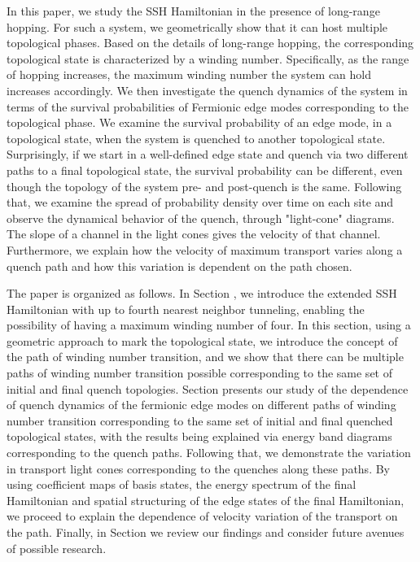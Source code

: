 \documentclass[aps,pra,reprint,superscriptaddress,longbibliography]{revtex4-2}
\newcommand{\RNum}[1]{\uppercase\expandafter{\romannumeral #1\relax}}
\begin{document}
In this paper, we study the SSH Hamiltonian in the presence of long-range hopping. For such a system, we geometrically show that it can host multiple topological phases. Based on the details of long-range hopping, the corresponding topological state is characterized by a winding number. Specifically, as the range of hopping increases, the maximum winding number the system can hold increases accordingly. We then investigate the quench dynamics of the system in terms of the survival probabilities of Fermionic edge modes corresponding to the topological phase. We examine the survival probability of an edge mode, in a topological state, when the system is quenched to another topological state. Surprisingly,  if we start in a well-defined edge state and quench via two different paths to a final topological state, the survival probability can be different, even though the topology of the system pre- and post-quench is the same. 
Following that, we examine the spread of probability density over time on each site and observe the dynamical behavior of the quench, through "light-cone" diagrams. The slope of a channel in the light cones gives the velocity of that channel. Furthermore, we explain how the velocity of maximum transport varies along a quench path and how this variation is dependent on the path chosen.

The paper is organized as follows. In Section \RNum{2}, we introduce the extended SSH Hamiltonian with up to fourth nearest neighbor tunneling, enabling the possibility of having a maximum winding number of four. In this section, using a geometric approach to mark the topological state, we introduce the concept of the path of winding number transition, and we show that there can be multiple paths of winding number transition possible corresponding to the same set of initial and final quench topologies. Section \RNum{3} presents our study of the dependence of quench dynamics of the fermionic edge modes on different paths of winding number transition corresponding to the same set of initial and final quenched topological states, with the results being explained via energy band diagrams corresponding to the quench paths. Following that, we demonstrate the variation in transport light cones corresponding to the quenches along these paths. By using coefficient maps of basis states, the energy spectrum of the final Hamiltonian and spatial structuring of the edge states of the final Hamiltonian, we proceed to explain the dependence of velocity variation of the transport on the path. Finally, in Section \RNum{4} we review our findings and consider future avenues of possible research.
	
\end{document}
